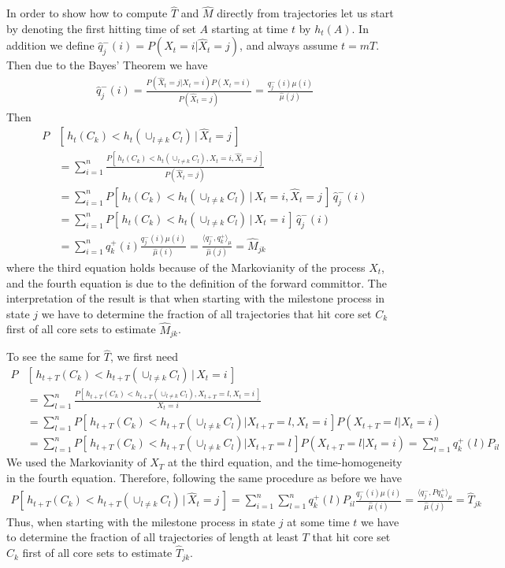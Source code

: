 \documentclass[aps, pre, preprint,unsortedaddress,a4paper,onecolumn]{revtex4}
\newcommand{\fwd}[0]{+}
\newcommand{\bwd}[0]{-}
\begin{document}
In order to show how to compute $\hat{T}$ and $\hat{M}$ directly from trajectories let us start by denoting the first hitting time of set $A$ starting at time $t$ by $h_t(A)$.
In addition we define $\hat q^\bwd_j (i) = P (X_t = i \vert \hat X_t =
j)$, and always assume $t = mT$. Then due to the Bayes' Theorem we have
\begin{align}
  \hat q^\bwd_j (i) =
  \frac{P (\hat X_t = j \vert X_t = i) P(X_t = i)}{ P(\hat X_t = j) } =
  \frac{q^\bwd_j(i) \mu(i)}{\hat \mu(j)}
\end{align}
Then
\begin{align*}
  P& [\,h_t(C_k) < h_t(\cup_{l\neq k} C_l) \,\vert\, \hat X_t = j\,]\\
  &=
  \sum_{i=1}^n
  \frac{P [\,h_t(C_k) < h_t(\cup_{l\neq k} C_l) , X_t = i, \hat X_t = j\,]}
  { P(\hat X_t = j )} \\
  &=
  \sum_{i=1}^n
  {P [\,h_t(C_k) < h_t(\cup_{l\neq k} C_l) \,\vert\, X_t = i, \hat X_t = j\,]}\,
  \hat q^\bwd_j(i) \\
  &=
  \sum_{i=1}^n
  {P [\,h_t(C_k) < h_t(\cup_{l\neq k} C_l) \,\vert\, X_t = i\,]}\,
  \hat q^\bwd_j(i)  \\
  &=
  \sum_{i=1}^n
  q^\fwd_k(i) \frac{q^\bwd_j(i) \mu(i)}{\hat \mu(i)} =\frac{\langle q_j^\bwd, q_k^\fwd\rangle_\mu}{\hat \mu(j)}={\hat M}_{jk}
\end{align*}
where the third equation holds because of the Markovianity of the process $X_t$, and the fourth equation is due to the definition of the forward committor.
The interpretation of the result is that when starting with the milestone process in state $j$ we have to determine the fraction of all trajectories that hit core set $C_k$ first of all core sets to estimate $\hat{M}_{jk}$.

To see the same for $\hat{T}$, we first need
\begin{align*}
  P & [\,h_{t+T}(C_k) < h_{t+T}(\cup_{l\neq k} C_l) \,\vert\, X_t = i\,]\\
  &=
  \sum_{l=1}^n
  \frac{P [\,h_{t+T}(C_k) < h_{t+T}(\cup_{l\neq k} C_l), X_{t+T} = l, X_t = i\,]}
  {X_t = i} \\
  &=
  \sum_{l=1}^n
  {P [\,h_{t+T}(C_k) < h_{t+T}(\cup_{l\neq k} C_l) \vert X_{t+T} = l, X_t = i\,]}
  {P( X_{t+T} = l \vert X_t = i)}\\
  & =
  \sum_{l=1}^n
  {P [\,h_{t+T}(C_k) < h_{t+T}(\cup_{l\neq k} C_l) \vert X_{t+T} = l\,]}
  {P( X_{t+T} = l \vert X_t = i)}  = \sum_{l=1}^n
  q^\fwd_k(l) P_{il}
\end{align*}
We used the Markovianity of $X_T$ at the third equation,
and the time-homogeneity in the fourth equation.
Therefore, following the same procedure as before we have
\begin{align*}
  P [\,h_{t+T}(C_k) < h_{t+T}(\cup_{l\neq k} C_l) \,\vert\, \hat X_t = j\,]=
  \sum_{i=1}^n\sum_{l=1}^n
  q^\fwd_k(l) P_{il}
  \frac{q^\bwd_j(i) \mu(i)}{\hat \mu(i)} = \frac{\langle q_j^\bwd, P q_k^\fwd\rangle_\mu}{\hat \mu(j)}  = {\hat T}_{jk}
\end{align*}
Thus, when starting with the milestone process in state $j$ at some time $t$ we have to determine the fraction of all trajectories of length at least $T$ that hit core set $C_k$ first of all core sets to estimate $\hat{T}_{jk}$.
\end{document}
